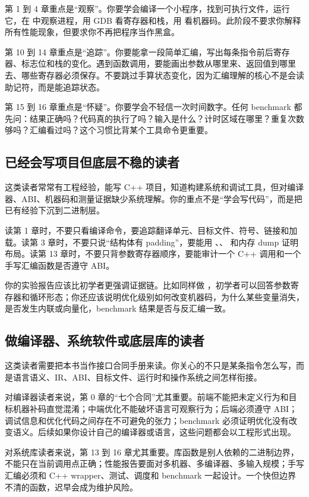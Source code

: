 第 1 到 4 章重点是“观察”。你要学会编译一个小程序，找到可执行文件，运行它，在  中观察进程，用 GDB 看寄存器和栈，用  看机器码。此阶段不要求你解释所有性能现象，但要求你不再把程序当作黑盒。

第 10 到 14 章重点是“追踪”。你要能拿一段简单汇编，写出每条指令前后寄存器、标志位和栈的变化。遇到函数调用，要能画出参数从哪里来、返回值到哪里去、哪些寄存器必须保存。不要跳过手算状态变化，因为汇编理解的核心不是会读助记符，而是能追踪状态。

第 15 到 16 章重点是“怀疑”。你要学会不轻信一次时间数字。任何 benchmark 都先问：结果正确吗？代码真的执行了吗？输入是什么？计时区域在哪里？重复次数够吗？汇编看过吗？这个习惯比背某个工具命令更重要。

\subsection{已经会写项目但底层不稳的读者}

这类读者常常有工程经验，能写 C++ 项目，知道构建系统和调试工具，但对编译器、ABI、机器码和测量证据缺少系统理解。你的重点不是“学会写代码”，而是把已有经验下沉到二进制层。

读第 1 章时，不要只看编译命令，要追踪翻译单元、目标文件、符号、链接和加载。读第 3 章时，不要只说“结构体有 padding”，要能用 、、 和内存 dump 证明布局。读第 13 章时，不要只背参数寄存器顺序，要能审计一个 C++ 调用和一个手写汇编函数是否遵守 ABI。

你的实验报告应该比初学者更强调证据链。比如同样做 ，初学者可以回答参数寄存器和循环形态；你还应该说明优化级别如何改变机器码，为什么某些变量消失，是否发生内联或向量化，benchmark 结果是否与反汇编一致。

\subsection{做编译器、系统软件或底层库的读者}

这类读者需要把本书当作接口合同手册来读。你关心的不只是某条指令怎么写，而是语言语义、IR、ABI、目标文件、运行时和操作系统之间怎样衔接。

对编译器读者来说，第 0 章的“七个合同”尤其重要。前端不能把未定义行为和目标机器补码直觉混淆；中端优化不能破坏语言可观察行为；后端必须遵守 ABI；调试信息和优化代码之间存在不可避免的张力；benchmark 必须证明优化没有改变语义。后续如果你设计自己的编译器或语言，这些问题都会以工程形式出现。

对系统库读者来说，第 13 到 16 章尤其重要。库函数是别人依赖的二进制边界，不能只在当前调用点正确；性能报告要面对多机器、多编译器、多输入规模；手写汇编必须和 C++ wrapper、测试、调度和 benchmark 一起设计。一个快但边界不清的函数，迟早会成为维护风险。

